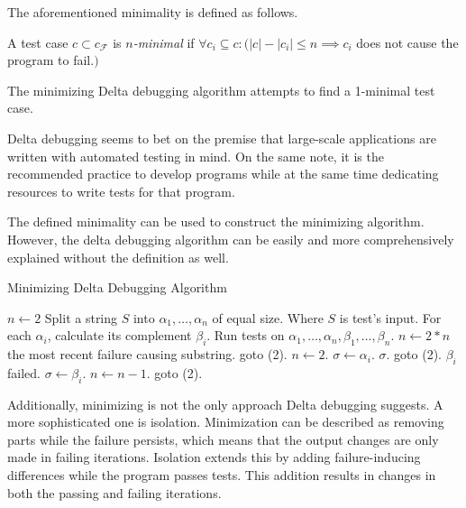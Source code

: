 The aforementioned minimality is defined as follows.

\begin{defn}[$n$-minimality]\label{def02:4}
  A test case $c \subset c_\mathcal{F}$ is \emph{$n$-minimal}
  if $\forall c_i \subseteq c:
  (|c| - |c_i| \leq n \implies c_i$ does not cause the program to fail.$)$
\end{defn}

The minimizing Delta debugging algorithm attempts to find a 1-minimal test case.

Delta debugging seems to bet on the premise that large-scale applications are written
with automated testing in mind. On the same note, it is the recommended practice to
develop programs while at the same time dedicating resources to write tests for that
program.

The defined minimality can be used to construct the minimizing algorithm. 
However, the delta debugging algorithm can be easily and more comprehensively explained 
without the definition as well.


\begin{algorithm}
	\caption{Minimizing Delta Debugging Algorithm} 
	\begin{algorithmic}[1]
		\State $n \leftarrow 2$
		\State Split a string $S$ into $\alpha_1,\dots,\alpha_n$ of equal size.
		\Comment Where $S$ is test's input.
		\State For each $\alpha_i$, calculate its complement $\beta_i$.
		\State Run tests on $\alpha_1,\dots,\alpha_n,\beta_1,\dots,\beta_n$.
			\State $n \leftarrow 2*n$
				\Return the most recent failure causing substring.
			\Else
				\State goto (2).
			\EndIf
			\State $n \leftarrow 2$.
			\State $\sigma \leftarrow \alpha_i$.
				\Return $\sigma$.
			\Else
				\State goto (2).
			\EndIf
		\Else
			\Comment $\beta_i$ failed.
			\State $\sigma \leftarrow \beta_i$.
			\State $n \leftarrow n - 1$.
			\State goto (2).
		\EndIf
	\end{algorithmic} 
\end{algorithm}

Additionally, minimizing is not the only approach Delta debugging suggests.
A more sophisticated one is isolation. Minimization can be described as removing parts
while the failure persists, which means that the output changes are only made in failing
iterations.
Isolation extends this by adding failure-inducing differences while the program passes tests.
This addition results in changes in both the passing and failing iterations.

